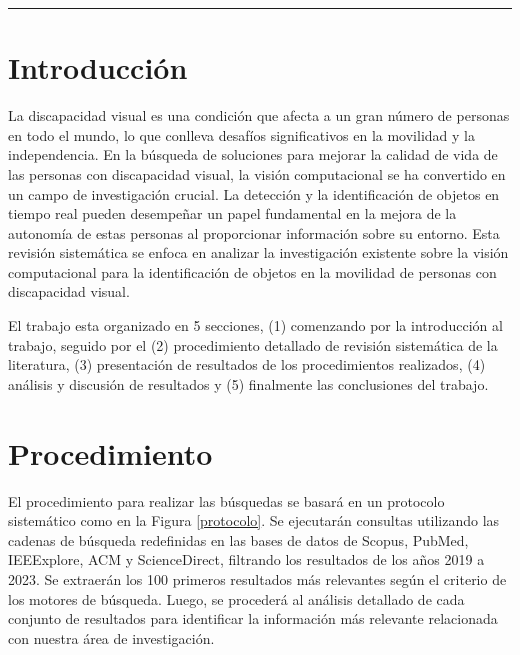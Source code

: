 \documentclass[letterpaper]{article}
\newcommand{\engkeywords}{\noindent\textit{Keywords:\ }}
\begin{document}
	\begin{center}
		\rule{.9\textwidth}{0.4pt}%
	\end{center}
	
	\tableofcontents
	\phantom{.}\vfill\phantom{.}
	\clearpage
	
		
	\twocolumn
	\section{Introducción}
    La discapacidad visual es una condición que afecta a un gran número de personas en todo el mundo, lo que conlleva desafíos significativos en la movilidad y la independencia. En la búsqueda de soluciones para mejorar la calidad de vida de las personas con discapacidad visual, la visión computacional se ha convertido en un campo de investigación crucial. La detección y la identificación de objetos en tiempo real pueden desempeñar un papel fundamental en la mejora de la autonomía de estas personas al proporcionar información sobre su entorno. Esta revisión sistemática se enfoca en analizar la investigación existente sobre la visión computacional para la identificación de objetos en la movilidad de personas con discapacidad visual.

    El trabajo esta organizado en 5 secciones, (1) comenzando por la introducción al trabajo, seguido por el (2) procedimiento detallado de revisión sistemática de la literatura, (3) presentación de resultados de los procedimientos realizados, (4) análisis y discusión de resultados y (5) finalmente las conclusiones del trabajo.
	

	\section{Procedimiento}
 El procedimiento para realizar las búsquedas se basará en un protocolo sistemático como en la Figura \ref{protocolo}. Se ejecutarán consultas utilizando las cadenas de búsqueda redefinidas en las bases de datos de Scopus, PubMed, IEEExplore, ACM y ScienceDirect, filtrando los resultados de los años 2019 a 2023. Se extraerán los 100 primeros resultados más relevantes según el criterio de los motores de búsqueda. Luego, se procederá al análisis detallado de cada conjunto de resultados para identificar la información más relevante relacionada con nuestra área de investigación.
\end{document}
